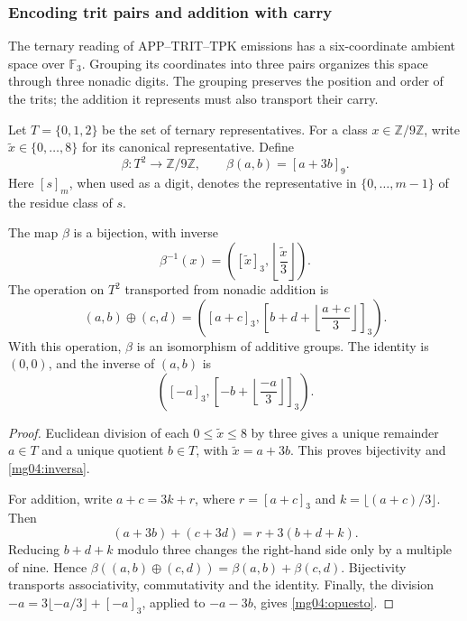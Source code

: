 \subsubsection{Encoding trit pairs and addition with carry}
\label{mg04:codificacion}

The ternary reading of APP--TRIT--TPK emissions has a six-coordinate
ambient space over \(\mathbb F_3\). Grouping its coordinates into
three pairs organizes this space through three nonadic digits. The
grouping preserves the position and order of the trits; the addition
it represents must also transport their carry.

Let \(T=\{0,1,2\}\) be the set of ternary representatives. For a
class \(x\in\mathbb Z/9\mathbb Z\), write
\(\widetilde x\in\{0,\ldots,8\}\) for its canonical representative.
Define
\begin{equation}
 \beta:T^2\longrightarrow\mathbb Z/9\mathbb Z,
 \qquad \beta(a,b)=[a+3b]_9.
 \label{mg04:beta}
\end{equation}
Here \([s]_m\), when used as a digit, denotes the representative
in \(\{0,\ldots,m-1\}\) of the residue class of \(s\).

\begin{proposition}
The map \(\beta\) is a bijection, with inverse
\begin{equation}
 \beta^{-1}(x)=
 \left([\widetilde x]_3,
       \left\lfloor\frac{\widetilde x}{3}\right\rfloor\right).
 \label{mg04:inversa}
\end{equation}
The operation on \(T^2\) transported from nonadic addition is
\begin{equation}
 (a,b)\oplus(c,d)=
 \left([a+c]_3,
 \left[b+d+\left\lfloor\frac{a+c}{3}\right\rfloor\right]_3\right).
 \label{mg04:suma}
\end{equation}
With this operation, \(\beta\) is an isomorphism of additive groups.
The identity is \((0,0)\), and the inverse of \((a,b)\) is
\begin{equation}
 \left([-a]_3,
 \left[-b+\left\lfloor\frac{-a}{3}\right\rfloor\right]_3\right).
 \label{mg04:opuesto}
\end{equation}
\end{proposition}

\begin{proof}
Euclidean division of each \(0\leq\widetilde x\leq8\) by three
gives a unique remainder \(a\in T\) and a unique quotient \(b\in T\),
with \(\widetilde x=a+3b\). This proves bijectivity and
\eqref{mg04:inversa}.

For addition, write \(a+c=3k+r\), where \(r=[a+c]_3\) and
\(k=\lfloor(a+c)/3\rfloor\). Then
\[
 (a+3b)+(c+3d)=r+3(b+d+k).
\]
Reducing \(b+d+k\) modulo three changes the right-hand side only
by a multiple of nine. Hence
\(\beta((a,b)\oplus(c,d))=\beta(a,b)+\beta(c,d)\).
Bijectivity transports associativity, commutativity and the identity.
Finally, the division \(-a=3\lfloor-a/3\rfloor+[-a]_3\), applied
to \(-a-3b\), gives \eqref{mg04:opuesto}.
\end{proof}

